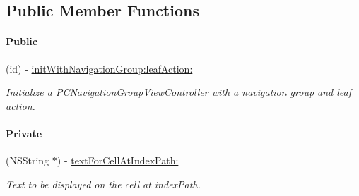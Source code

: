 \subsection*{Public Member Functions}
\begin{Indent}\paragraph*{Public}
\begin{DoxyCompactItemize}
\item 
\hypertarget{interface_p_c_navigation_group_view_controller_aedd9a0a04eda1bf7c09f460c2810cd45}{
(id) -\/ \hyperlink{interface_p_c_navigation_group_view_controller_aedd9a0a04eda1bf7c09f460c2810cd45}{initWithNavigationGroup:leafAction:}}
\label{interface_p_c_navigation_group_view_controller_aedd9a0a04eda1bf7c09f460c2810cd45}

\begin{DoxyCompactList}\small\item\em Initialize a \hyperlink{interface_p_c_navigation_group_view_controller}{PCNavigationGroupViewController} with a navigation group and leaf action. \end{DoxyCompactList}\end{DoxyCompactItemize}
\end{Indent}
\begin{Indent}\paragraph*{Private}
\begin{DoxyCompactItemize}
\item 
\hypertarget{interface_p_c_navigation_group_view_controller_ac114c93e6534eb806b1a334d319f0018}{
(NSString $\ast$) -\/ \hyperlink{interface_p_c_navigation_group_view_controller_ac114c93e6534eb806b1a334d319f0018}{textForCellAtIndexPath:}}
\label{interface_p_c_navigation_group_view_controller_ac114c93e6534eb806b1a334d319f0018}

\begin{DoxyCompactList}\small\item\em Text to be displayed on the cell at indexPath. \end{DoxyCompactList}\end{DoxyCompactItemize}
\end{Indent}
